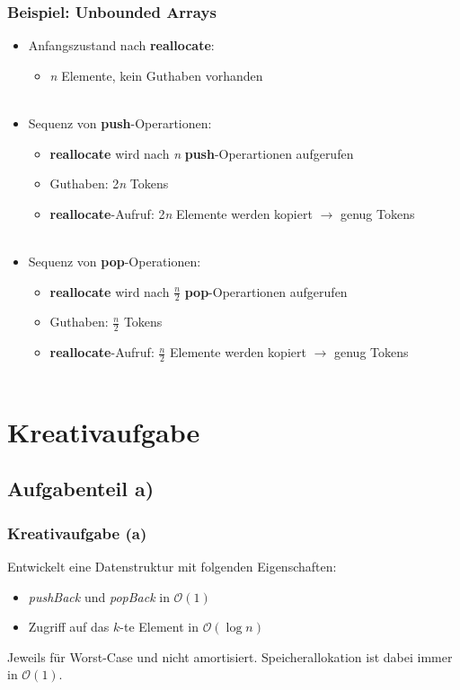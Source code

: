 \documentclass[18pt]{beamer}
\begin{document}
\begin{frame}
	\frametitle{Beispiel: Unbounded Arrays}
	\begin{itemize}
		\item Anfangszustand nach \textbf{reallocate}:
		\begin{itemize}
			\item \textit{n} Elemente, kein Guthaben vorhanden \\ \ \\
		\end{itemize}


		\item Sequenz von \textbf{push}-Operartionen:
		\begin{itemize}
			\item \textbf{reallocate} wird nach \textit{n} \textbf{push}-Operartionen aufgerufen
			\item Guthaben: 2\textit{n} Tokens
			\item \textbf{reallocate}-Aufruf: 2\textit{n} Elemente werden kopiert $\rightarrow$ genug Tokens \\ \ \\
		\end{itemize} 

		\item Sequenz von \textbf{pop}-Operationen:
		\begin{itemize}
			\item \textbf{reallocate} wird nach \textit{$\frac{n}{2}$} \textbf{pop}-Operartionen aufgerufen
			\item Guthaben: \textit{$\frac{n}{2}$} Tokens
			\item \textbf{reallocate}-Aufruf: \textit{$\frac{n}{2}$} Elemente werden kopiert $\rightarrow$ genug Tokens \\ \ \\
		\end{itemize} 

	\end{itemize}
\end{frame}

\section{Kreativaufgabe}

\subsection{Aufgabenteil a)}
\begin{frame}
	\frametitle{Kreativaufgabe (a)}
	Entwickelt eine Datenstruktur mit folgenden Eigenschaften:

	\begin{itemize}
		\item \emph{pushBack} und \emph{popBack} in $\mathcal{O}(1)$
		\item Zugriff auf das $k$-te Element in $\mathcal{O}(\log{n})$
	\end{itemize}

	Jeweils für Worst-Case und nicht amortisiert.
	Speicherallokation ist dabei immer in $\mathcal{O}(1)$.
\end{frame}
\end{document}
